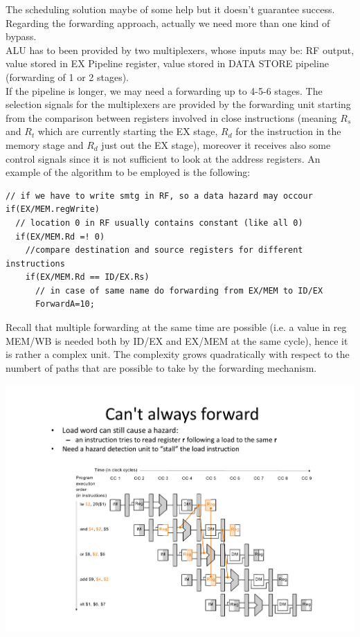 The scheduling solution maybe of some help but it doesn't guarantee success.
Regarding the forwarding approach, actually we need more than one kind of
bypass.\\
ALU has to been provided by two multiplexers, whose inputs may be: RF output,
value stored in EX Pipeline register, value stored in DATA STORE pipeline
(forwarding of 1 or 2 stages).\\
If the pipeline is longer, we may need a forwarding up to 4-5-6 stages. The
selection signals for the multiplexers are provided by the forwarding unit
starting from the comparison between registers involved in close instructions
(meaning $R_s$ and $R_t$ which are currently starting the EX stage, $R_d$ for
the instruction in the memory stage and $R_d$ just out the EX stage), moreover
it receives also some control signals since it is not sufficient to look at
the address registers. An example of the algorithm to be employed is the
following:

\begin{verbatim}
// if we have to write smtg in RF, so a data hazard may occour
if(EX/MEM.regWrite)
  // location 0 in RF usually contains constant (like all 0)
  if(EX/MEM.Rd =! 0)
    //compare destination and source registers for different instructions
    if(EX/MEM.Rd == ID/EX.Rs)
      // in case of same name do forwarding from EX/MEM to ID/EX
      ForwardA=10;
\end{verbatim}

Recall that multiple forwarding at the same time are possible (i.e. a value in
reg MEM/WB is needed both by ID/EX and EX/MEM at the same cycle), hence it is
rather a complex unit. The complexity grows quadratically with respect to the
numbert of paths that are possible to take by the forwarding mechanism.

\begin{center}
  \includegraphics[width=0.6\linewidth]{img/img3/mips5}
\end{center}

